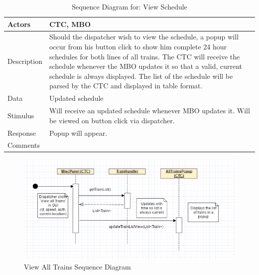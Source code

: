 \documentclass[]{article}
\begin{document}
\begin{table}[H]
	\centering
	\caption{Sequence Diagram for: View Schedule}
	\begin{tabular}{|l|l|}
		\hline
		Actors & \parbox[t]{10cm}{CTC, MBO} \\ \hline
		Description & \parbox[t]{10cm}{Should the dispatcher wish to view the schedule, a popup will occur from his button click to show him complete 24 hour schedules for both lines of all trains. The CTC will receive the schedule whenever the MBO updates it so that a valid, current schedule is always displayed. The list of the schedule will be parsed by the CTC and displayed in table format.} \\ \hline
		Data &  \parbox[t]{10cm}{Updated schedule} \\ \hline
		Stimulus &  \parbox[t]{10cm}{Will receive an updated schedule whenever MBO updates it. Will be viewed on button click via dispatcher.} \\ \hline
		Response & \parbox[t]{10cm}{Popup will appear.}\\ \hline
		Comments & \parbox[t]{10cm}{ }  \\ \hline
	\end{tabular}
\end{table}

\begin{figure}[H]
	\centering
	\includegraphics[width=\textwidth]{CTCviewAllTrains.png}
	\caption{View All Trains Sequence Diagram}
\end{figure}
\end{document}
